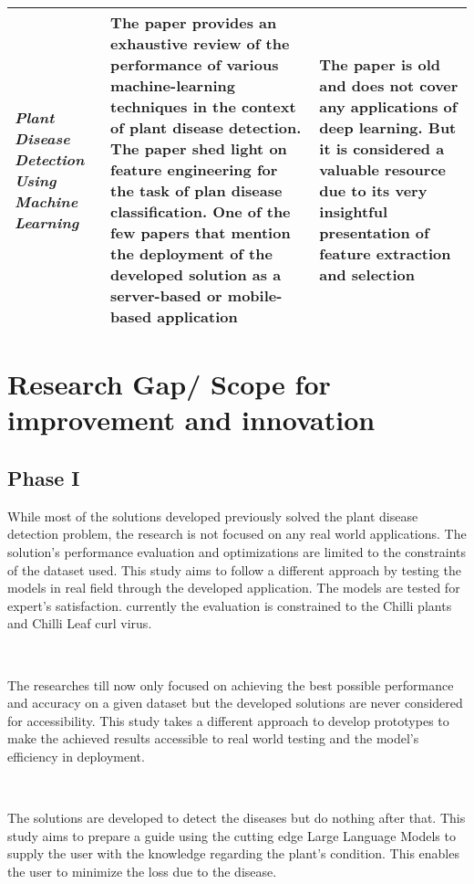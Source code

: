 \begin{table}[h!]
\begin{tabular}{|p{5cm}|p{5cm}|p{5cm}|}
      \textit{Plant Disease Detection Using Machine Learning} & The paper provides an exhaustive review of the performance of various machine-learning techniques in the context of plant disease detection. The paper shed light on feature engineering for the task of plan disease classification. One of the few papers that mention the deployment of the developed solution as a server-based or mobile-based application & The paper is old and does not cover any applications of deep learning. But it is considered a valuable resource due to its very insightful presentation of feature extraction and selection \\ \hline

    \end{tabular}
    \label{tab:comparison}
\end{table}

\section{Research Gap/ Scope for improvement and innovation}

\subsection{Phase I}

While most of the solutions developed previously solved the plant disease detection problem, the research is not focused on any real world applications. The solution's performance evaluation and optimizations are limited to the constraints of the dataset used. This study aims to follow a different approach by testing the models in real field through the developed application. The models are tested for expert's satisfaction. currently the evaluation is constrained to the Chilli plants and Chilli Leaf curl virus.

\

The researches till now only focused on achieving the best possible performance and accuracy on a given dataset but the developed solutions are never considered for accessibility. This study takes a different approach to develop prototypes to make the achieved results accessible to real world testing and the model's efficiency in deployment.

\

The solutions are developed to detect the diseases but do nothing after that. This study aims to prepare a guide using the cutting edge Large Language Models to supply the user with the knowledge regarding the plant's condition. This enables the user to minimize the loss due to the disease.

